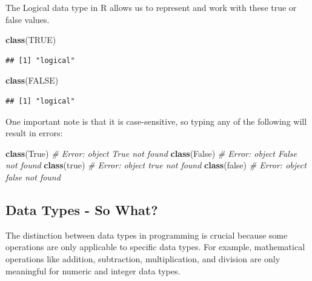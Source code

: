 \documentclass[
]{book}
\newenvironment{Shaded}{\begin{snugshade}}{\end{snugshade}}
\newcommand{\CommentTok}[1]{\textcolor[rgb]{0.56,0.35,0.01}{\textit{#1}}}
\newcommand{\ConstantTok}[1]{\textcolor[rgb]{0.56,0.35,0.01}{#1}}
\newcommand{\FunctionTok}[1]{\textcolor[rgb]{0.13,0.29,0.53}{\textbf{#1}}}
\newcommand{\NormalTok}[1]{#1}
\begin{document}
The Logical data type in R allows us to represent and work with these true or false values.

\begin{Shaded}
\begin{Highlighting}[]
\FunctionTok{class}\NormalTok{(}\ConstantTok{TRUE}\NormalTok{)}
\end{Highlighting}
\end{Shaded}

\begin{verbatim}
## [1] "logical"
\end{verbatim}

\begin{Shaded}
\begin{Highlighting}[]
\FunctionTok{class}\NormalTok{(}\ConstantTok{FALSE}\NormalTok{)}
\end{Highlighting}
\end{Shaded}

\begin{verbatim}
## [1] "logical"
\end{verbatim}

One important note is that it is case-sensitive, so typing any of the following will result in errors:

\begin{Shaded}
\begin{Highlighting}[]
\FunctionTok{class}\NormalTok{(True)   }\CommentTok{\# Error: object \textquotesingle{}True\textquotesingle{} not found}
\FunctionTok{class}\NormalTok{(False)  }\CommentTok{\# Error: object \textquotesingle{}False\textquotesingle{} not found}
\FunctionTok{class}\NormalTok{(true)   }\CommentTok{\# Error: object \textquotesingle{}true\textquotesingle{} not found}
\FunctionTok{class}\NormalTok{(false)  }\CommentTok{\# Error: object \textquotesingle{}false\textquotesingle{} not found}
\end{Highlighting}
\end{Shaded}

\subsection{Data Types - So What?}\label{data-types---so-what}

The distinction between data types in programming is crucial because some operations are only applicable to specific data types. For example, mathematical operations like addition, subtraction, multiplication, and division are only meaningful for numeric and integer data types.
\end{document}

